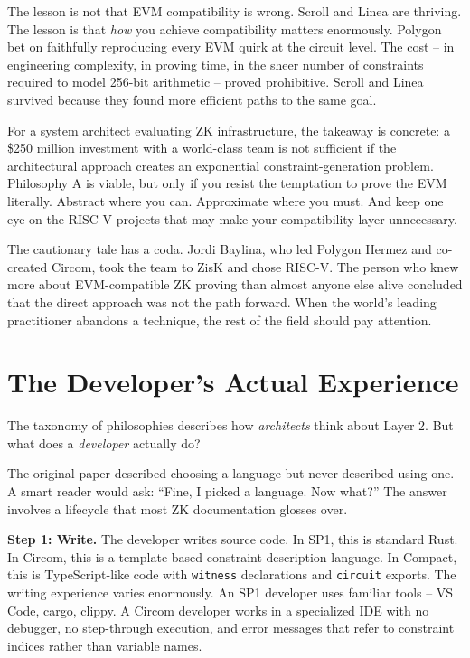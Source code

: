 \documentclass[
  11pt,
  openany]{report}
\renewcommand{\textbf}[1]{{\bfseries\color{MidnightBold}#1}}
\begin{document}
The lesson is not that EVM compatibility is wrong. Scroll and Linea are
thriving. The lesson is that \emph{how} you achieve compatibility matters
enormously. Polygon bet on faithfully reproducing every EVM quirk at the circuit
level. The cost -- in engineering complexity, in proving time, in the sheer
number of constraints required to model 256-bit arithmetic -- proved
prohibitive. Scroll and Linea survived because they found more efficient paths
to the same goal.

For a system architect evaluating ZK infrastructure, the takeaway is concrete: a
\$250 million investment with a world-class team is not sufficient if the
architectural approach creates an exponential constraint-generation problem.
Philosophy A is viable, but only if you resist the temptation to prove the EVM
literally. Abstract where you can. Approximate where you must. And keep one eye
on the RISC-V projects that may make your compatibility layer unnecessary.

The cautionary tale has a coda. Jordi Baylina, who led Polygon Hermez and
co-created Circom, took the team to ZisK and chose RISC-V. The person who knew
more about EVM-compatible ZK proving than almost anyone else alive concluded
that the direct approach was not the path forward. When the world's leading
practitioner abandons a technique, the rest of the field should pay attention.

\section{The Developer's Actual
Experience}\label{the-developers-actual-experience}

The taxonomy of philosophies describes how \emph{architects} think about Layer
2. But what does a \emph{developer} actually do?

The original paper described choosing a language but never described using one.
A smart reader would ask: ``Fine, I picked a language. Now what?'' The answer
involves a lifecycle that most ZK documentation glosses over.

\textbf{Step 1: Write.} The developer writes source code. In SP1, this is
standard Rust. In Circom, this is a template-based constraint description
language. In Compact, this is TypeScript-like code with \texttt{witness}
declarations and \texttt{circuit} exports. The writing experience varies
enormously. An SP1 developer uses familiar tools -- VS Code, cargo, clippy. A
Circom developer works in a specialized IDE with no debugger, no step-through
execution, and error messages that refer to constraint indices rather than
variable names.
\end{document}
